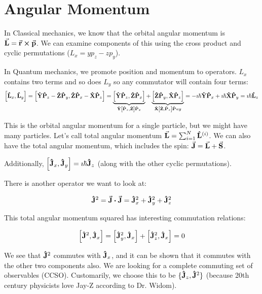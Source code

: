 \documentclass[a4paper,twoside,master.tex]{subfiles}
\begin{document}
\chapter{Angular Momentum}

In Classical mechanics, we know that the orbital angular momentum is $ \va{L} = \va{r} \cross \va{p} $. We can examine components of this using the cross product and cyclic permutations ($ L_x = y p_z - z p_y $).

In Quantum mechanics, we promote position and momentum to operators. $ L_x $ contains two terms and so does $ L_y $ so any commutator will contain four terms:
\begin{equation}
    \comm{ \vu{L}_x}{ \vu{L}_y} = \comm{ \vu{Y} \vu{P}_z - \vu{Z} \vu{P}_y}{ \vu{Z} \vu{P}_x - \vu{X} \vu{P}_z} = \underbrace{\comm{ \vu{Y} \vu{P}_z}{ \vu{Z} \vu{P}_x}}_{ \vu{Y} \comm{ \vu{P}_z}{ \vu{Z}} \vu{P}_x} + \underbrace{\comm{ \vu{Z} \vu{P}_y}{ \vu{X} \vu{P}_z}}_{ \vu{X} \comm{ \vu{Z}}{ \vu{P}_z} \vu{P} u y} = - \imath \hbar \vu{Y} \vu{P}_x + \imath \hbar \vu{X} \vu{P}_y = \imath \hbar \vu{L}_z
\end{equation}

This is the orbital angular momentum for a single particle, but we might have many particles. Let's call total angular momentum $ \va{L} = \sum_{i=1}^{N} \vu{L}^{(i)} $. We can also have the total angular momentum, which includes the spin: $ \va{J} = \va{L} + \va{S} $.

Additionally, $ \comm{ \vu{J}_x}{ \vu{J}_y} = \imath \hbar \vu{J}_z $ (along with the other cyclic permutations).

There is another operator we want to look at:

\begin{equation}
    \vu{J}^2 = \va{J} \vdot \va{J} = \vu{J}_x^2 + \vu{J}_y^2 + \vu{J}_z^2
\end{equation}

This total angular momentum squared has interesting commutation relations:

\begin{equation}
    \comm{ \vu{J}^2}{ \vu{J}_x} = \comm{ \vu{J}_y^2}{ \vu{J}_x} + \comm{ \vu{J}_z^2}{ \vu{J}_x} = 0 
\end{equation}

We see that $ \vu{J}^2 $ commutes with $ \vu{J}_x $, and it can be shown that it commutes with the other two components also. We are looking for a complete commuting set of observables (CCSO). Customarily, we choose this to be $ \{ \vu{J}_z, \vu{J}^2\} $ (because 20th century physicists love Jay-Z according to Dr. Widom).
\end{document}

